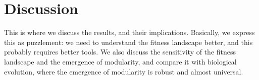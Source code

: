 \section{Discussion}
This is where we discuss the results, and their implications. Basically, we
express this as puzzlement: we need to understand the fitness landscape better,
and this probably requires better tools. We also discuss the sensitivity of the
fitness landscape and the emergence of modularity, and compare it with 
biological evolution, where the emergence of modularity is robust and almost
universal.
